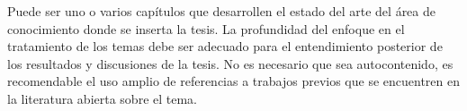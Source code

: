 Puede ser uno o varios capítulos que desarrollen el estado del arte del área de conocimiento donde se inserta la tesis. La profundidad del enfoque en el tratamiento de los temas debe ser adecuado para el entendimiento posterior de los resultados y discusiones de la tesis. No es necesario que sea autocontenido, es recomendable el uso amplio de referencias a trabajos previos que se encuentren en la literatura abierta sobre el tema.